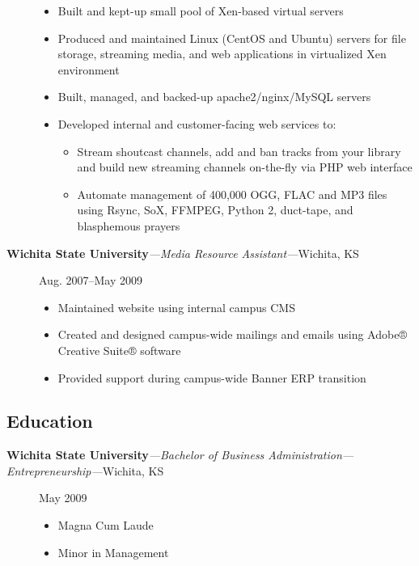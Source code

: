 \begin{description}
\begin{itemize}
\item
  Built and kept-up small pool of Xen-based virtual servers
\item
  Produced and maintained Linux (CentOS and Ubuntu) servers for file
  storage, streaming media, and web applications in virtualized Xen
  environment
\item
  Built, managed, and backed-up apache2/nginx/MySQL servers
\item
  Developed internal and customer-facing web services to:

  \begin{itemize}
  \item
    Stream shoutcast channels, add and ban tracks from your library and
    build new streaming channels on-the-fly via PHP web interface
  \item
    Automate management of 400,000 OGG, FLAC and MP3 files using Rsync,
    SoX, FFMPEG, Python 2, duct-tape, and blasphemous prayers
  \end{itemize}
\end{itemize}
\item[\textbf{Wichita State University}\emph{---Media Resource
Assistant---}Wichita, KS]
Aug. 2007--May 2009

\begin{itemize}
\item
  Maintained website using internal campus CMS
\item
  Created and designed campus-wide mailings and emails using Adobe®
  Creative Suite® software
\item
  Provided support during campus-wide Banner ERP transition
\end{itemize}
\end{description}

\subsection{Education}\label{education}

\begin{description}
\item[\textbf{Wichita State University}\emph{---Bachelor of Business
Administration---Entrepreneurship---}Wichita, KS]
May 2009

\begin{itemize}
\itemsep1pt\parskip0pt
\item
  Magna Cum Laude
\item
  Minor in Management
\end{itemize}
\end{description}
